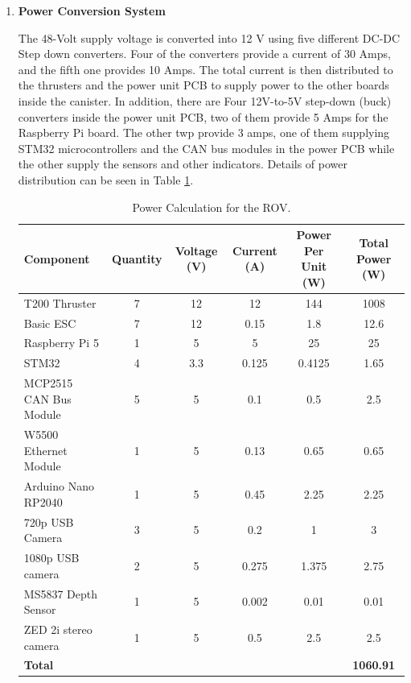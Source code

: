 \vspace{-0.5\baselineskip}
\begin{enumerate}[label=(\roman*), leftmargin=0pt, itemindent=20pt]
    \setlength{\itemsep}{0pt}
    \item \textbf{Power Conversion System}
    
    The 48-Volt supply voltage is converted into 12 V using five different DC-DC Step down converters. Four of the converters provide a current of 30 Amps, and the fifth one provides 10 Amps. The total current is then distributed to the thrusters and the power unit PCB to supply power to the other boards inside the canister. In addition, there are Four 12V-to-5V step-down (buck) converters inside the power unit PCB, two of them provide 5 Amps for the Raspberry Pi board. The other twp provide 3 amps, one of them supplying STM32 microcontrollers and the CAN bus modules in the power PCB while the other supply the sensors and other indicators. Details of power distribution can be seen in Table \ref{tab:power_calculation}.

    \begin{table}[hb!]
        \centering
        \begin{adjustbox}{max width=\columnwidth}
        \begin{tabular}{@{} l *{5}{c} @{}}
          \toprule
          \textbf{Component} & \textbf{Quantity} & \textbf{Voltage (V)} & \textbf{Current (A)} & \textbf{Power Per Unit (W)} & \textbf{Total Power (W)} \\
          \midrule
          T200 Thruster            & 7 & 12   & 12     & 144    & 1008   \\
          Basic ESC                & 7 & 12   & 0.15   & 1.8    & 12.6   \\
          Raspberry Pi 5           & 1 & 5    & 5      & 25     & 25     \\
          STM32                    & 4 & 3.3  & 0.125  & 0.4125 & 1.65   \\
          MCP2515 CAN Bus Module   & 5 & 5    & 0.1    & 0.5    & 2.5    \\
          W5500 Ethernet Module    & 1 & 5    & 0.13   & 0.65   & 0.65   \\
          Arduino Nano RP2040      & 1 & 5    & 0.45   & 2.25   & 2.25   \\
          720p USB Camera          & 3 & 5    & 0.2    & 1      & 3      \\
          1080p USB camera         & 2 & 5    & 0.275  & 1.375  & 2.75   \\
          MS5837 Depth Sensor      & 1 & 5    & 0.002  & 0.01   & 0.01   \\
          ZED 2i stereo camera     & 1 & 5    & 0.5    & 2.5    & 2.5    \\
          \midrule
         \multicolumn{5}{l}{\textbf{Total}} & \textbf{1060.91} \\
          \bottomrule
        \end{tabular}
        \end{adjustbox}
    \caption{Power Calculation for the ROV.}
    \label{tab:power_calculation}
    \end{table}


\end{enumerate}
